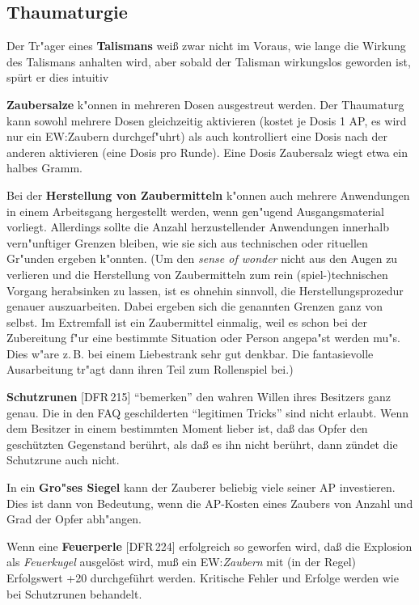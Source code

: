 \documentclass[10pt,a4paper,germanpar]{article}
\begin{document}
\subsection{Thaumaturgie}

Der Tr"ager eines \textbf{Talismans} weiß zwar nicht im Voraus, wie
lange die Wirkung des Talismans anhalten wird, aber sobald der
Talisman wirkungslos geworden ist, spürt er dies intuitiv

\textbf{Zaubersalze} k"onnen in mehreren Dosen ausgestreut werden. Der
Thaumaturg kann sowohl mehrere Dosen gleichzeitig aktivieren (kostet
je Dosis 1 AP, es wird nur ein EW:Zaubern durchgef"uhrt) als auch
kontrolliert eine Dosis nach der anderen aktivieren (eine Dosis pro
Runde). Eine Dosis Zaubersalz wiegt etwa ein halbes Gramm.

Bei der \textbf{Herstellung von Zaubermitteln} k"onnen auch mehrere
Anwendungen in einem Arbeitsgang hergestellt werden, wenn gen"ugend
Ausgangsmaterial vorliegt. Allerdings sollte die Anzahl
herzustellender Anwendungen innerhalb vern"unftiger Grenzen bleiben,
wie sie sich aus technischen oder rituellen Gr"unden ergeben k"onnten.
(Um den \emph{sense of wonder} nicht aus den Augen zu verlieren und
die Herstellung von Zaubermitteln zum rein (spiel-)technischen Vorgang
herabsinken zu lassen, ist es ohnehin sinnvoll, die
Herstellungsprozedur genauer auszuarbeiten. Dabei ergeben sich die
genannten Grenzen ganz von selbst. Im Extremfall ist ein Zaubermittel
einmalig, weil es schon bei der Zubereitung f"ur eine bestimmte
Situation oder Person angepa"st werden mu"s. Dies w"are z.\,B. bei einem
Liebestrank sehr gut denkbar. Die fantasievolle Ausarbeitung tr"agt
dann ihren Teil zum Rollenspiel bei.)

\textbf{Schutzrunen} [DFR\,215] "`bemerken"' den wahren Willen ihres
Besitzers ganz genau. Die in den FAQ geschilderten "`legitimen
Tricks"' sind nicht erlaubt. Wenn dem Besitzer in einem bestimmten
Moment lieber ist, daß das Opfer den geschützten Gegenstand berührt,
als daß es ihn nicht berührt, dann zündet die Schutzrune auch nicht.

In ein \textbf{Gro"ses Siegel} kann der Zauberer beliebig viele seiner
AP investieren. Dies ist dann von Bedeutung, wenn die AP-Kosten eines
Zaubers von Anzahl und Grad der Opfer abh"angen.

Wenn eine \textbf{Feuerperle} [DFR\,224] erfolgreich so geworfen wird,
daß die Explosion als \emph{Feuerkugel} ausgelöst wird, muß ein
EW:\emph{Zaubern} mit (in der Regel) Erfolgswert +20 durchgeführt
werden. Kritische Fehler und Erfolge werden wie bei Schutzrunen
behandelt.
\end{document}
